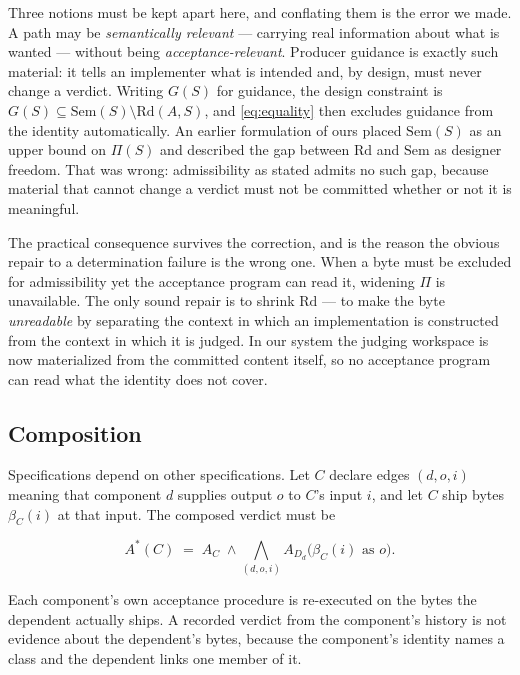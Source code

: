 \documentclass[10pt,twocolumn]{article}
\newcommand{\Rd}{\mathrm{Rd}}
\newcommand{\Sem}{\mathrm{Sem}}
\begin{document}
Three notions must be kept apart here, and conflating them is the error
we made. A path may be \emph{semantically relevant} --- carrying
real information about what is wanted --- without being
\emph{acceptance-relevant}. Producer guidance is exactly such material:
it tells an implementer what is intended and, by design, must never
change a verdict. Writing $G(S)$ for guidance, the design constraint is
$G(S) \subseteq \Sem(S) \setminus \Rd(A,S)$, and \eqref{eq:equality}
then excludes guidance from the identity automatically. An earlier
formulation of ours placed $\Sem(S)$ as an upper bound on $\Pi(S)$ and
described the gap between $\Rd$ and $\Sem$ as designer freedom. That was
wrong: admissibility as stated admits no such gap, because material
that cannot change a verdict must not be committed whether or not it is
meaningful.

The practical consequence survives the correction, and is the reason the
obvious repair to a determination failure is the wrong one. When a byte
must be excluded for admissibility yet the acceptance program can read
it, widening $\Pi$ is unavailable. The only sound repair is to shrink
$\Rd$ --- to make the byte \emph{unreadable} by separating the context
in which an implementation is constructed from the context in which it
is judged. In our system the judging workspace is now materialized from
the committed content itself, so no acceptance program can read what the
identity does not cover.

\subsection{Composition}

Specifications depend on other specifications. Let $C$ declare edges
$(d,o,i)$ meaning that component $d$ supplies output $o$ to $C$'s input
$i$, and let $C$ ship bytes $\beta_C(i)$ at that input. The composed
verdict must be

\begin{equation}
A^{*}(C) \;=\; A_C \;\wedge\!\! \bigwedge_{(d,o,i)}\! A_{D_d}\big(\beta_C(i) \text{ as } o\big).
\label{eq:compose}
\end{equation}

Each component's own acceptance procedure is re-executed on the bytes the
dependent actually ships. A recorded verdict from the component's history
is not evidence about the dependent's bytes, because the component's
identity names a class and the dependent links one member of it.
\end{document}
